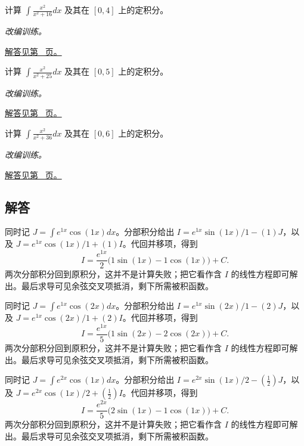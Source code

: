 \documentclass[12pt,fontset=fandol]{ctexart}
\begin{document}
\begin{example}[先拆分再积分的有理式]\label{ex:c15q22}
计算 $\displaystyle\int\frac{x^2}{x^2+16}dx$ 及其在 $[0,4]$ 上的定积分。
\par\textit{改编训练。}\par\hyperref[ans:c15q22]{解答见第~\pageref{ans:c15q22} 页。}
\end{example}
\begin{example}[先拆分再积分的有理式]\label{ex:c15q23}
计算 $\displaystyle\int\frac{x^2}{x^2+25}dx$ 及其在 $[0,5]$ 上的定积分。
\par\textit{改编训练。}\par\hyperref[ans:c15q23]{解答见第~\pageref{ans:c15q23} 页。}
\end{example}
\begin{example}[先拆分再积分的有理式]\label{ex:c15q24}
计算 $\displaystyle\int\frac{x^2}{x^2+36}dx$ 及其在 $[0,6]$ 上的定积分。
\par\textit{改编训练。}\par\hyperref[ans:c15q24]{解答见第~\pageref{ans:c15q24} 页。}
\end{example}
\subsection{解答}
\begin{solve}\label{ans:c15q1}
同时记 $J=\int e^{1x}\cos(1x)dx$。分部积分给出 $I=e^{1x}\sin(1x)/1-(1)J$，以及 $J=e^{1x}\cos(1x)/1+(1)I$。代回并移项，得到
\[
I=\frac{e^{1x}}{2}\bigl(1\sin(1x)-1\cos(1x)\bigr)+C.
\]
两次分部积分回到原积分，这并不是计算失败；把它看作含 $I$ 的线性方程即可解出。最后求导可见余弦交叉项抵消，剩下所需被积函数。
\end{solve}

\begin{solve}\label{ans:c15q2}
同时记 $J=\int e^{1x}\cos(2x)dx$。分部积分给出 $I=e^{1x}\sin(2x)/1-(2)J$，以及 $J=e^{1x}\cos(2x)/1+(2)I$。代回并移项，得到
\[
I=\frac{e^{1x}}{5}\bigl(1\sin(2x)-2\cos(2x)\bigr)+C.
\]
两次分部积分回到原积分，这并不是计算失败；把它看作含 $I$ 的线性方程即可解出。最后求导可见余弦交叉项抵消，剩下所需被积函数。
\end{solve}

\begin{solve}\label{ans:c15q3}
同时记 $J=\int e^{2x}\cos(1x)dx$。分部积分给出 $I=e^{2x}\sin(1x)/2-(\frac{1}{2})J$，以及 $J=e^{2x}\cos(1x)/2+(\frac{1}{2})I$。代回并移项，得到
\[
I=\frac{e^{2x}}{5}\bigl(2\sin(1x)-1\cos(1x)\bigr)+C.
\]
两次分部积分回到原积分，这并不是计算失败；把它看作含 $I$ 的线性方程即可解出。最后求导可见余弦交叉项抵消，剩下所需被积函数。
\end{solve}
\end{document}
